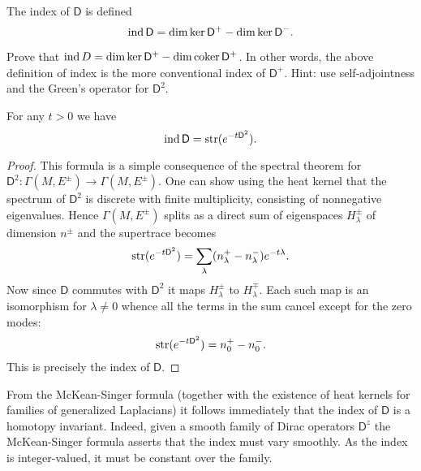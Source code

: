 \documentclass{amsart}
\renewcommand\d{\mathsf{D}}
\begin{document}
The index of $\d$ is defined 
\begin{equation*}
    \ind \d = \dim \ker \d^+ - \dim \ker \d^-.
\end{equation*}
\begin{exercise}
    Prove that $\ind D = \dim\ker\d^+ - \dim\coker\d^+$. In other words, the above
    definition of index is the more conventional index of $\d^+$. Hint: use
    self-adjointness and the Green's operator for $\d^2$.
\end{exercise}

\begin{theorem}
    For any $t>0$ we have
    \begin{equation*}
        \ind\d = \Str(e^{-t\d^2}).
    \end{equation*}
\end{theorem}
\begin{proof}
    This formula is a simple consequence of the spectral theorem for
    $\d^2:\Gamma(M,E^\pm)\to\Gamma(M,E^\pm)$.
    One can show using the heat kernel that the spectrum of $\d^2$ is discrete
    with finite multiplicity, consisting of nonnegative eigenvalues. Hence
    $\Gamma(M, E^\pm)$ splits as a direct sum of eigenspaces $H_\lambda^\pm$
    of dimension $n^\pm$ and the supertrace becomes
    \begin{equation*}
        \Str(e^{-t\d^2}) = \sum_{\lambda} (n_\lambda^+ - n_\lambda^-)e^{-t\lambda}.
    \end{equation*}
    Now since $\d$ commutes with $\d^2$ it maps $H_\lambda^\pm$ to $H_\lambda^\mp$.
    Each such map is an isomorphism for $\lambda\neq0$ whence all the terms in the
    sum cancel except for the zero modes:
    \begin{equation*}
        \Str(e^{-t\d^2}) = n_0^+ - n_0^-.
    \end{equation*}
    This is precisely the index of $\d$.
\end{proof}
From the McKean-Singer formula (together with the existence of heat kernels for
families of generalized Laplacians) it follows immediately that the index of $\d$ is
a homotopy invariant. Indeed, given a smooth family of Dirac operators $\d^z$
the McKean-Singer formula asserts that the index must vary smoothly. As the index
is integer-valued, it must be constant over the family.

\end{document}
